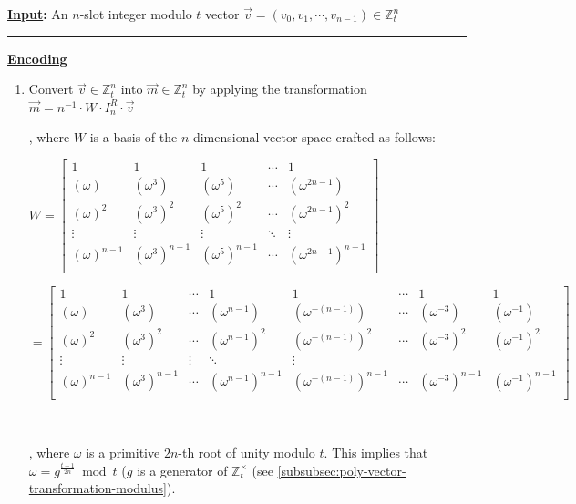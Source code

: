 \begin{tcolorbox}[title={\textbf{\tboxlabel{\ref*{subsubsec:bfv-encoding-summary}} BFV's Encoding and Decoding}}]



\textbf{\underline{Input}:} An $n$-slot integer modulo $t$ vector $\vec{v} = (v_0, v_1, \cdots, v_{n-1}) \in \mathbb{Z}_t^n$

\par\noindent\rule{\textwidth}{0.4pt}

\textbf{\underline{Encoding}} 
\begin{enumerate}

\item Convert $\vec{v} \in \mathbb{Z}_t^n$ into $\vec{m} \in \mathbb{Z}_t^n$ by applying the transformation $\vec{m} = n^{-1}\cdot W \cdot I_n^R \cdot \vec{v}$

, where $W$ is a basis of the $n$-dimensional vector space crafted as follows: 

$W =  \begin{bmatrix}
1 & 1 & 1 & \cdots & 1\\
(\omega) & (\omega^3) & (\omega^5) & \cdots & (\omega^{2n-1})\\
(\omega)^2 & (\omega^3)^2 & (\omega^5)^2 & \cdots & (\omega^{2n-1})^2\\
\vdots & \vdots & \vdots & \ddots & \vdots \\
(\omega)^{n-1} & (\omega^3)^{n-1} & (\omega^5)^{n-1} & \cdots & (\omega^{2n-1})^{n-1}\\
\end{bmatrix}$

$= \begin{bmatrix}
1 & 1 & \cdots & 1 & 1 & \cdots & 1 & 1\\
(\omega) & (\omega^3) & \cdots & (\omega^{n - 1}) & (\omega^{-(n - 1)}) & \cdots & (\omega^{-3}) & (\omega^{-1})\\
(\omega)^2 & (\omega^3)^2 & \cdots & (\omega^{n - 1})^2 & (\omega^{-(n - 1)})^2 & \cdots & (\omega^{-3})^2 & (\omega^{-1})^2\\
\vdots & \vdots & \vdots & \ddots & \vdots \\
(\omega)^{n-1} & (\omega^3)^{n-1} & \cdots & (\omega^{n - 1})^{n-1} & (\omega^{-(n - 1)})^{n-1} & \cdots & (\omega^{-3})^{n-1} & (\omega^{-1})^{n-1}\\
\end{bmatrix}$

$ $

, where $\omega$ is a primitive $2n$-th root of unity modulo $t$. This implies that $\omega = g^{\frac{t - 1}{2n}} \bmod t$ ($g$ is a generator of $\mathbb{Z}_t^{\times}$ (see \autoref{subsubsec:poly-vector-transformation-modulus}).


\end{enumerate}
\end{tcolorbox}
